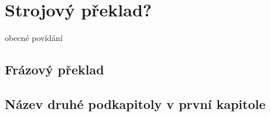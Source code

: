 \chapter{Strojový překlad?}

obecné povídání

\section{Frázový překlad}

\section{Název druhé podkapitoly v první kapitole}

